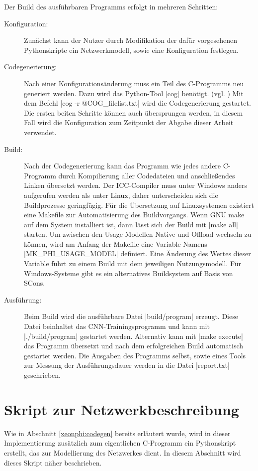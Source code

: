 \documentclass[../main.tex]{subfiles}
\begin{document}
Der Build des ausführbaren Programms erfolgt in mehreren Schritten: 
\begin{description}
\item[Konfiguration: ] Zunächst kann der Nutzer durch Modifikation der dafür vorgesehenen Pythonskripte ein Netzwerkmodell, sowie eine Konfiguration festlegen. 
\item[Codegenerierung: ] Nach einer Konfigurationsänderung muss ein Teil des C-Programms neu generiert werden. Dazu wird das Python-Tool |cog| benötigt. (vgl. \cite{COGdocumentation}) Mit dem Befehl |cog -r @COG_filelist.txt| wird die Codegenerierung gestartet. Die ersten beiten Schritte können auch übersprungen werden, in diesem Fall wird die Konfiguration zum Zeitpunkt der Abgabe dieser Arbeit verwendet. 
\item[Build: ] Nach der Codegenerierung kann das Programm wie jedes andere C-Programm durch Kompilierung aller Codedateien und anschließendes Linken übersetzt werden. Der ICC-Compiler muss unter Windows anders aufgerufen werden als unter Linux, daher unterscheiden sich die Buildprozesse geringfügig. Für die Übersetzung auf Linuxsystemen existiert eine Makefile zur Automatisierung des Buildvorgangs. Wenn GNU make auf dem System installiert ist, dann lässt sich der Build mit |make all| starten. Um zwischen den Usage Modellen Native und Offload wechseln zu können, wird am Anfang der Makefile eine Variable Namens |MK_PHI_USAGE_MODEL| definiert. Eine Änderung des Wertes dieser Variable führt zu einem Build mit dem jeweiligen Nutzungsmodell. Für Windows-Systeme gibt es ein alternatives Buildsystem auf Basis von SCons. 
\item[Ausführung: ] Beim Build wird die ausführbare Datei |build/program| erzeugt. Diese Datei beinhaltet das CNN-Trainingsprogramm und kann mit |./build/program| gestartet werden. Alternativ kann mit |make execute| das Programm übersetzt und nach dem erfolgreichen Build automatisch gestartet werden. Die Ausgaben des Programms selbst, sowie eines Tools zur Messung der Ausführungsdauer werden in die Datei |report.txt| geschrieben. 
\end{description}

\section{Skript zur Netzwerkbeschreibung} \label{xeonphi:netdesk}
Wie in Abschnitt \ref{xeonphi:codegen} bereits erläutert wurde, wird in dieser Implementierung zusätzlich zum eigentlichen C-Programm ein Pythonskript erstellt, das zur Modellierung des Netzwerkes dient. In diesem Abschnitt wird dieses Skript näher beschrieben. 
\end{document}
